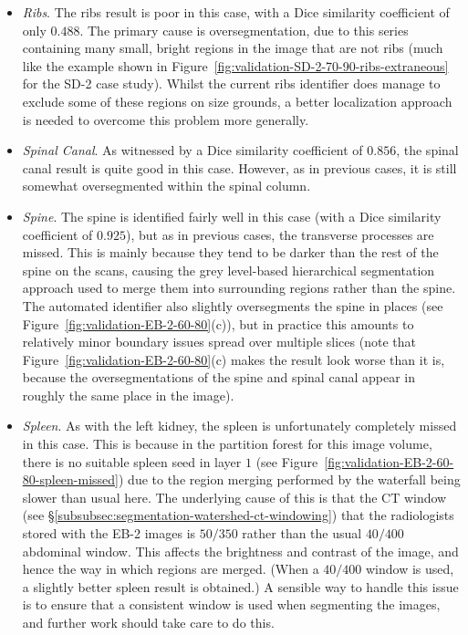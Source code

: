 \begin{itemize}
\item \emph{Ribs}. The ribs result is poor in this case, with a Dice similarity coefficient of only $0.488$. The primary cause is oversegmentation, due to this series containing many small, bright regions in the image that are not ribs (much like the example shown in Figure~\ref{fig:validation-SD-2-70-90-ribs-extraneous} for the SD-2 case study). Whilst the current ribs identifier does manage to exclude some of these regions on size grounds, a better localization approach is needed to overcome this problem more generally.

\item \emph{Spinal Canal}. As witnessed by a Dice similarity coefficient of $0.856$, the spinal canal result is quite good in this case. However, as in previous cases, it is still somewhat oversegmented within the spinal column.

\item \emph{Spine}. The spine is identified fairly well in this case (with a Dice similarity coefficient of $0.925$), but as in previous cases, the transverse processes are missed. This is mainly because they tend to be darker than the rest of the spine on the scans, causing the grey level-based hierarchical segmentation approach used to merge them into surrounding regions rather than the spine. The automated identifier also slightly oversegments the spine in places (see Figure~\ref{fig:validation-EB-2-60-80}(c)), but in practice this amounts to relatively minor boundary issues spread over multiple slices (note that Figure~\ref{fig:validation-EB-2-60-80}(c) makes the result look worse than it is, because the oversegmentations of the spine and spinal canal appear in roughly the same place in the image).

\item \emph{Spleen}. As with the left kidney, the spleen is unfortunately completely missed in this case. This is because in the partition forest for this image volume, there is no suitable spleen seed in layer $1$ (see Figure~\ref{fig:validation-EB-2-60-80-spleen-missed}) due to the region merging performed by the waterfall being slower than usual here. The underlying cause of this is that the CT window (see \S\ref{subsubsec:segmentation-watershed-ct-windowing}) that the radiologists stored with the EB-2 images is $50/350$ rather than the usual $40/400$ abdominal window. This affects the brightness and contrast of the image, and hence the way in which regions are merged. (When a $40/400$ window is used, a slightly better spleen result is obtained.) A sensible way to handle this issue is to ensure that a consistent window is used when segmenting the images, and further work should take care to do this.

\end{itemize}

